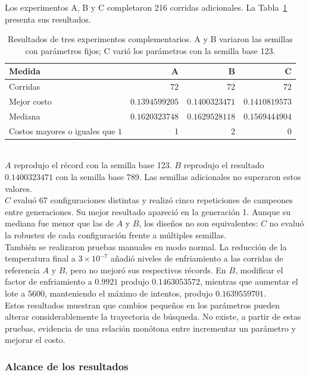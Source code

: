 \documentclass[12pt]{article}
\begin{document}
Los experimentos A, B y C completaron 216 corridas adicionales.
La Tabla~\ref{tab:150-complementarios} presenta sus resultados.
\begin{table}[htbp]
    \centering
    \small
    \begin{tabular}{lrrr}
        \hline
        Medida & A & B & C \\
        \hline
        Corridas & 72 & 72 & 72 \\
        Mejor costo
            & $0.1394599205$ & $0.1400323471$ & $0.1410819573$ \\
        Mediana
            & $0.1620323748$ & $0.1629528118$ & $0.1569444904$ \\
        Costos mayores o iguales que $1$
            & 1 & 2 & 0 \\
        \hline
    \end{tabular}
    \caption{Resultados de tres experimentos complementarios.
    A y B variaron las semillas con parámetros fijos; C varió
    los parámetros con la semilla base 123.}
    \label{tab:150-complementarios}
\end{table}
\\
$A$ reprodujo el récord con la semilla base 123. $B$ reprodujo el
resultado $0.1400323471$ con la semilla base 789. Las semillas
adicionales no superaron estos valores.
\\
$C$ evaluó 67 configuraciones distintas y realizó cinco repeticiones
de campeones entre generaciones. Su mejor resultado apareció en
la generación 1. Aunque su mediana fue menor que las de $A$ y $B$,
los diseños no son equivalentes: $C$ no evaluó la robustez de cada
configuración frente a múltiples semillas.
\\
También se realizaron pruebas manuales en modo normal. La
reducción de la temperatura final a $3\times10^{-7}$ añadió
niveles de enfriamiento a las corridas de referencia $A$ y $B$,
pero no mejoró sus respectivos récords. En $B$, modificar el
factor de enfriamiento a $0.9921$ produjo $0.1463053572$,
mientras que aumentar el lote a 5600, manteniendo el máximo
de intentos, produjo $0.1639559701$.
\\
Estos resultados muestran que cambios pequeños en los parámetros
pueden alterar considerablemente la trayectoria de búsqueda.
No existe, a partir de estas pruebas, evidencia de una relación
monótona entre incrementar un parámetro y mejorar el costo.

\subsubsection{Alcance de los resultados}
\end{document}

